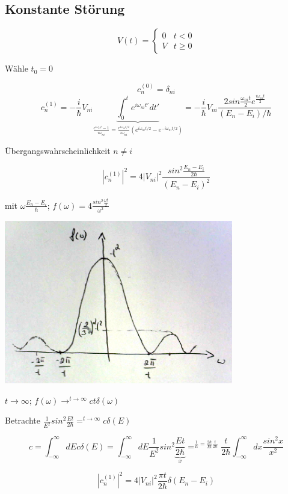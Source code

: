 \subsection{Konstante Störung}

\[V(t) = \begin{cases}
  0  & t<0\\
  V& t\geq 0
\end{cases}\]

Wähle \(t_0 = 0\)

\[ c^{(0)}_n = \delta_{ni}\]
\[ c^{(1)}_n = -\frac{i}{\hbar} V_{ni}\underbrace{\int_0^t e^{i\omega_{ni}t'}dt'}_{\frac{e^{i\omega_{ni}t}-1}{i\omega_{ni}}=\frac{e^{i\omega_{ni}t/2}}{i\omega_{ni}}(e^{i\omega_{ni}t/2}-e^{-i\omega_{ni}t/2})}=-\frac{i}{\hbar}V_{ni}\frac{2sin\frac{\omega_{ni}t}{2}e^{\frac{i\omega_{ni}t}{2}}}{(E_n-E_i)/\hbar}\]

Übergangswahrscheinlichkeit \(n\neq i\)

\[ |c^{(1)}_n|^2 = 4|V_{ni}|^2 \frac{sin^2\frac{E_n-E_i}{2\hbar}}{(E_n-E_i)^2} \]

mit \(\omega \frac{E_n-E_i}{\hbar}\); \(f(\omega) = 4\frac{sin^2\frac{\omega t}{2}}{\omega^2}\)


\includegraphics[width=0.75\textwidth]{kap03_07.png}

\(t\rightarrow \infty\); \(f(\omega) \rightarrow^{t\rightarrow \infty} c t\delta(\omega)\)

Betrachte \(\frac{1}{E^2}sin^2 \frac{Et}{2\hbar} =^{t\rightarrow \infty} c\delta(E)\)

\[ c = \int_{-\infty}^{\infty} dE c\delta(E) = \int_{-\infty}^{\infty} dE \frac{1}{E^2}sin^2\frac{Et}{\underbrace{2\hbar}_{x}} =^{\frac{1}{E}=\frac{2\hbar}{Et}\frac{t}{2\hbar}} \frac{t}{2\hbar} \int_{-\infty}^{\infty} dx \frac{sin^2 x}{x^2} \]

\[ |c^{(1)}_n|^2 = 4|V_{ni}|^2 \frac{\pi t}{2\hbar} \delta(E_n-E_i) \]

